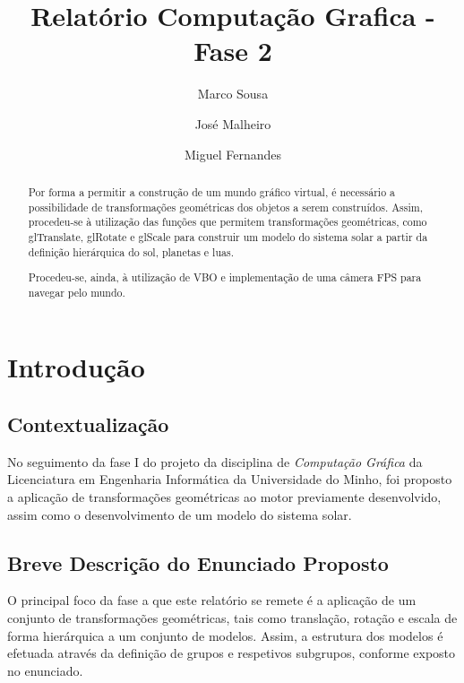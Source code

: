 \documentclass[runningheads]{llncs}
\begin{document}
%
\title{Relatório Computação Grafica - Fase 2}
\author{Marco Sousa \and
    José Malheiro \and
    Miguel Fernandes}
%
%
\maketitle              %
%
\begin{abstract}
    Por forma a permitir a construção de um mundo gráfico virtual, é necessário 
    a possibilidade de transformações geométricas dos objetos a serem 
    construídos.
    Assim, procedeu-se à utilização das funções que permitem transformações geométricas,
    como glTranslate, glRotate e glScale para construir um modelo do sistema solar
    a partir da definição hierárquica do sol, planetas e luas.
    
    Procedeu-se, ainda, à utilização de VBO e implementação de uma câmera FPS para 
    navegar pelo mundo.
    
\end{abstract}

\section{Introdução}

\subsection{Contextualização}

No seguimento da fase I do projeto da disciplina de \textit{Computação Gráfica} da Licenciatura em
Engenharia Informática da Universidade do Minho, foi proposto a aplicação de transformações geométricas
ao motor previamente desenvolvido, assim como o desenvolvimento de um modelo do sistema solar.

\subsection{Breve Descrição do Enunciado Proposto}
O principal foco da fase a que este relatório se remete é a aplicação de um conjunto de transformações geométricas,
tais como translação, rotação e escala de forma hierárquica a um conjunto de modelos.
Assim, a estrutura dos modelos é efetuada através da definição de grupos e respetivos subgrupos,
conforme exposto no enunciado.
\end{document}
